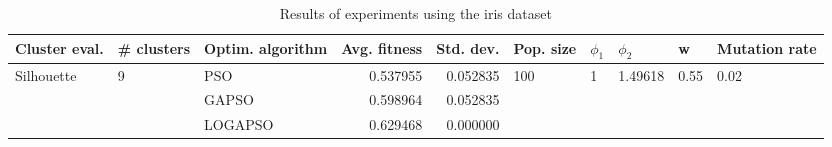 \begin{table}
\centering
\caption{Results of experiments using the iris dataset}
\begin{tabular}{lllrrlllll}
\toprule
              Cluster eval. &        \# clusters & Optim. algorithm &  Avg. fitness &  Std. dev. &            Pop. size &         $\phi_{1}$ &               $\phi_{2}$ &                     w &         Mutation rate \\
\midrule
\multirow{3}{*}{Silhouette} & \multirow{3}{*}{9} &              PSO &      0.537955 &   0.052835 & \multirow{3}{*}{100} & \multirow{3}{*}{1} & \multirow{3}{*}{1.49618} & \multirow{3}{*}{0.55} & \multirow{3}{*}{0.02} \\
                            &                    &            GAPSO &      0.598964 &   0.052835 &                      &                    &                          &                       &                       \\
                            &                    &          LOGAPSO &      0.629468 &   0.000000 &                      &                    &                          &                       &                       \\
\bottomrule
\end{tabular}
\end{table}
